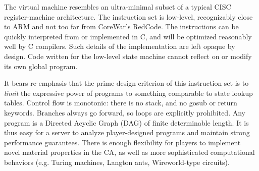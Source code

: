 \documentclass{acm_proc_article-sp}
\begin{document}
The virtual machine resembles an ultra-minimal subset of a typical CISC register-machine architecture.
The instruction set is low-level, recognizably close to ARM\cite{seal00} and not too far from CoreWar's RedCode\cite{CoreWarGuidelines84}.
The instructions can be quickly interpreted from or implemented in C, and will be optimized reasonably well by C compilers.
Such details of the implementation are left opaque by design.
Code written for the low-level state machine cannot reflect on or modify its own global program.
\begin{center}
\end{center}
It bears re-emphasis that the prime design criterion of this instruction set is to {\em limit} the expressive power of programs
to something comparable to state lookup tables.
Control flow is monotonic: there is no stack, and no gosub or return keywords.
Branches always go forward, so loops are explicitly prohibited.
Any program is a Directed Acyclic Graph (DAG) of finite determinable length.
It is thus easy for a server to analyze player-designed programs and maintain strong performance guarantees.
There is enough flexibility for players to implement novel material properties in the CA,
as well as more sophisticated computational behaviors (e.g. Turing machines, Langton ants, Wireworld-type circuits).
\end{document}
